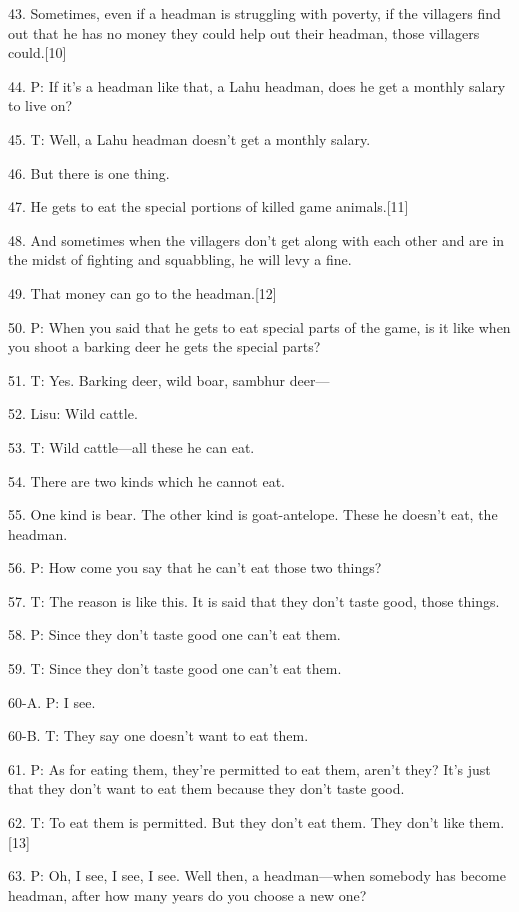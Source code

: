 {43. Sometimes, even if a headman is struggling with poverty, if the villagers
find out that he has no money they could help out their headman, those villagers
could.[10]}

{44. P: If it's a headman like that, a Lahu headman, does he get a monthly
salary to live on?}

{45. T: Well, a Lahu headman doesn't get a monthly salary.}

{46. But there is one thing.}

{47. He gets to eat the special portions of killed game animals.[11]}

{48. And sometimes when the villagers don't get along with each other and
are in the midst of fighting and squabbling, he will levy a fine.}

{49. That money can go to the headman.[12]}

{50. P: When you said that he gets to eat special parts of the game, is
it like when you shoot a barking deer he gets the special parts?}

{51. T: Yes. Barking deer, wild boar, sambhur deer---}

{52. Lisu: Wild cattle.}

{53. T: Wild cattle---all these he can eat.}

{54. There are two kinds which he cannot eat.}

{55. One kind is bear. The other kind is goat-antelope. These he doesn't
eat, the headman.}

{56. P: How come you say that he can't eat those two things?}

{57. T: The reason is like this. It is said that they don't taste good,
those things.}

{58. P: Since they don't taste good one can't eat them.}

{59. T: Since they don't taste good one can't eat them.}

{60-A. P: I see.}

{60-B. T: They say one doesn't want to eat them.}

{61. P: As for eating them, they're permitted to eat them, aren't they?
It's just that they don't want to eat them because they don't taste good.}

{62. T: To eat them is permitted. But they don't eat them. They don't like
them.[13]}

{63. P: Oh, I see, I see, I see. Well then, a headman---when somebody has
become headman, after how many years do you choose a new one?}

